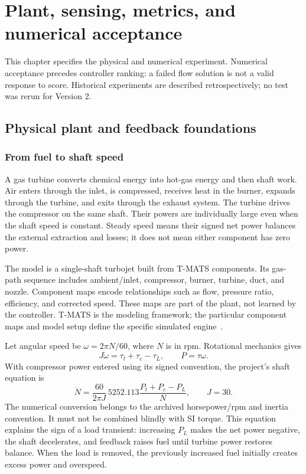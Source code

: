 \chapter{Plant, sensing, metrics, and numerical acceptance}
\label{ch:plant}
This chapter specifies the physical and numerical experiment. Numerical acceptance precedes controller ranking: a failed flow solution is not a valid response to score. Historical experiments are described retrospectively; no test was rerun for Version 2.

\section{Physical plant and feedback foundations}
\subsection{From fuel to shaft speed}
A gas turbine converts chemical energy into hot-gas energy and then shaft work. Air enters through the inlet, is compressed, receives heat in the burner, expands through the turbine, and exits through the exhaust system. The turbine drives the compressor on the same shaft. Their powers are individually large even when the shaft speed is constant. Steady speed means their signed net power balances the external extraction and losses; it does not mean either component has zero power.

The model is a single-shaft turbojet built from T-MATS components. Its gas-path sequence includes ambient/inlet, compressor, burner, turbine, duct, and nozzle. Component maps encode relationships such as flow, pressure ratio, efficiency, and corrected speed. These maps are part of the plant, not learned by the controller. T-MATS is the modeling framework; the particular component maps and model setup define the specific simulated engine~\cite{tmatsguide}.

Let angular speed be $\omega=2\pi N/60$, where $N$ is in rpm. Rotational mechanics gives
\begin{equation}J\dot\omega=\tau_t+\tau_c-\tau_L,\qquad P=\tau\omega.
\end{equation}
With compressor power entered using its signed convention, the project's shaft equation is
\begin{equation}
\dot N=\frac{60}{2\pi J}\,5252.113\frac{P_t+P_c-P_L}{N},\qquad J=30.
\end{equation}
The numerical conversion belongs to the archived horsepower/rpm and inertia convention. It must not be combined blindly with SI torque. This equation explains the sign of a load transient: increasing $P_L$ makes the net power negative, the shaft decelerates, and feedback raises fuel until turbine power restores balance. When the load is removed, the previously increased fuel initially creates excess power and overspeed.

